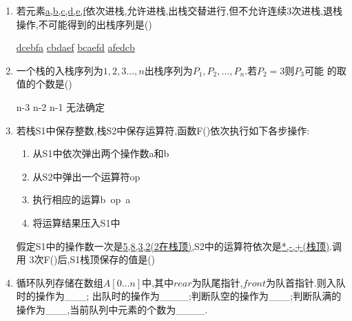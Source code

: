 \documentclass[12pt, a4paper, oneside, UTF8]{ctexbook}
\begin{document}
\begin{enumerate}
    \item \bl 若元素\underline{a,b,c,d,e,f}依次进栈,允许进栈,出栈交替进行,但不允许连续3次进栈,退栈
    操作,不可能得到的出栈序列是() 
    \begin{choices}
        \task \underline{dcebfa}
        \task \underline{cbdaef}
        \task \underline{bcaefd}
        \task \underline{afedcb} 
    \end{choices}


    \item \bl 一个栈的入栈序列为\underline{$1,2,3\ldots,n$}出栈序列为$P_1,P_2,\ldots,P_n$.若$P_2=3$则$P_3$可能 
    的取值的个数是() 
    \begin{choices}
        \task n-3
        \task n-2
        \task n-1
        \task 无法确定 
    \end{choices}

    \item \bl 若栈S1中保存整数,栈S2中保存运算符,函数F()依次执行如下各步操作: 
    \begin{enumerate}[label= (\arabic*)]
        \item 从S1中依次弹出两个操作数a和b
        \item 从S2中弹出一个运算符op
        \item 执行相应的运算b\ op\ a 
        \item 将运算结果压入S1中 
    \end{enumerate}
    假定S1中的操作数一次是\underline{5,8,3,2(2在栈顶)},S2中的运算符依次是\underline{*,-,+(栈顶)}.调用
    3次F()后,S1栈顶保存的值是() 
    \begin{choices}
    \end{choices}

    \item 循环队列存储在数组$A[0\ldots n]$中,其中$rear$为队尾指针,$front$为队首指针.则入队时的操作为\_\_\_;
    出队时的操作为\_\_\_\_;判断队空的操作为\_\_\_;判断队满的操作为\_\_\_,当前队列中元素的个数为\_\_\_\_. 


\end{enumerate}
\end{document}
